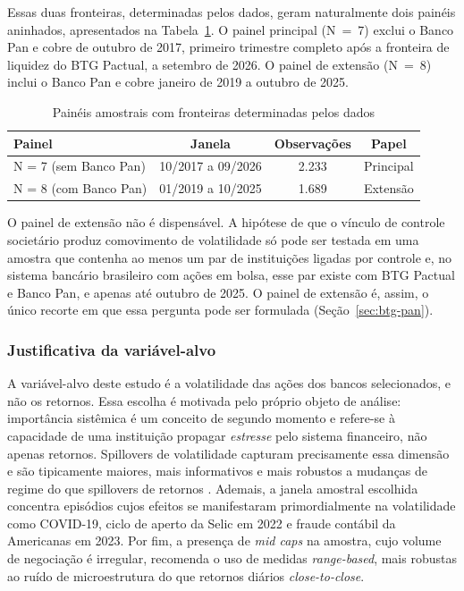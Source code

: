 \documentclass[12pt, a4paper, oneside, english, brazil]{abntex2}
\begin{document}
Essas duas fronteiras, determinadas pelos dados, geram
naturalmente dois painéis aninhados, apresentados na Tabela~\ref{tab:paineis}.
O painel principal (N~=~7) exclui o Banco Pan e cobre de outubro de 2017, primeiro trimestre
completo após a fronteira de liquidez do BTG Pactual, a setembro de 2026. O painel de extensão (N~=~8) inclui o Banco Pan e cobre janeiro de
2019 a outubro de 2025.

\begin{table}[!htbp]
\centering
\caption{Painéis amostrais com fronteiras determinadas pelos dados}
\label{tab:paineis}
\begin{tabular}{lccc}
\toprule
Painel & Janela & Observações & Papel \\
\midrule
N = 7 (sem Banco Pan) & 10/2017 a 09/2026 & 2.233 & Principal \\
N = 8 (com Banco Pan) & 01/2019 a 10/2025 & 1.689 & Extensão \\
\bottomrule
\end{tabular}
\end{table}

O painel de extensão não é dispensável. A hipótese de que o vínculo de controle societário
produz comovimento de volatilidade só pode ser testada em uma amostra que contenha ao menos
um par de instituições ligadas por controle e, no sistema bancário brasileiro com ações em
bolsa, esse par existe com BTG Pactual e Banco Pan, e apenas até outubro de 2025.
O painel de extensão é, assim, o único recorte em que essa pergunta pode ser formulada
(Seção~\ref{sec:btg-pan}).


\subsubsection*{Justificativa da variável-alvo}

A variável-alvo deste estudo é a volatilidade das ações dos bancos selecionados, e não os
retornos. Essa escolha é motivada pelo próprio objeto de análise: importância sistêmica é um
conceito de segundo momento e refere-se à capacidade de uma instituição propagar
\textit{estresse} pelo sistema financeiro, não apenas retornos. Spillovers de volatilidade
capturam precisamente essa dimensão e são tipicamente maiores, mais informativos e mais
robustos a mudanças de regime do que spillovers de retornos \parencite{diebold2009}. Ademais,
a janela amostral escolhida concentra episódios cujos efeitos se manifestaram primordialmente
na volatilidade como COVID-19, ciclo de aperto da Selic
em 2022 e fraude contábil da Americanas em 2023. Por fim, a presença de \textit{mid caps}
na amostra, cujo volume de negociação é irregular, recomenda o uso de medidas
\textit{range-based}, mais robustas ao ruído de microestrutura do que retornos diários
\textit{close-to-close}.
\end{document}
